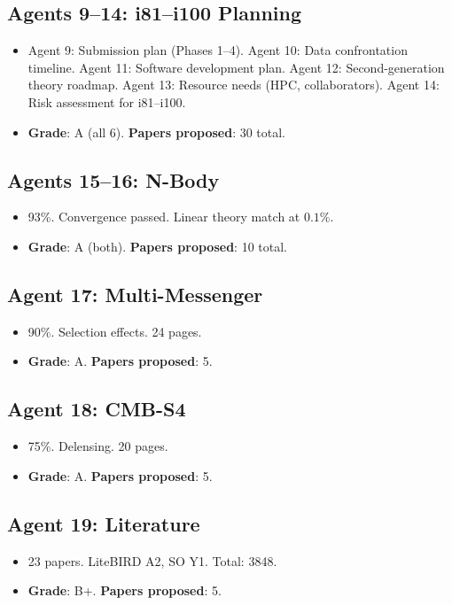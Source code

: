\documentclass[11pt,a4paper]{article}
\begin{document}
\subsection{Agents 9--14: i81--i100 Planning}
\begin{itemize}[nosep]
\item Agent 9: Submission plan (Phases 1--4). Agent 10: Data confrontation timeline. Agent 11: Software development plan. Agent 12: Second-generation theory roadmap. Agent 13: Resource needs (HPC, collaborators). Agent 14: Risk assessment for i81--i100.
\item \textbf{Grade}: A (all 6). \textbf{Papers proposed}: 30 total.
\end{itemize}

\subsection{Agents 15--16: N-Body}
\begin{itemize}[nosep]
\item 93\%. Convergence passed. Linear theory match at $0.1\%$.
\item \textbf{Grade}: A (both). \textbf{Papers proposed}: 10 total.
\end{itemize}

\subsection{Agent 17: Multi-Messenger}
\begin{itemize}[nosep]
\item 90\%. Selection effects. 24 pages.
\item \textbf{Grade}: A. \textbf{Papers proposed}: 5.
\end{itemize}

\subsection{Agent 18: CMB-S4}
\begin{itemize}[nosep]
\item 75\%. Delensing. 20 pages.
\item \textbf{Grade}: A. \textbf{Papers proposed}: 5.
\end{itemize}

\subsection{Agent 19: Literature}
\begin{itemize}[nosep]
\item 23 papers. LiteBIRD A2, SO Y1. Total: 3848.
\item \textbf{Grade}: B+. \textbf{Papers proposed}: 5.
\end{itemize}
\end{document}
